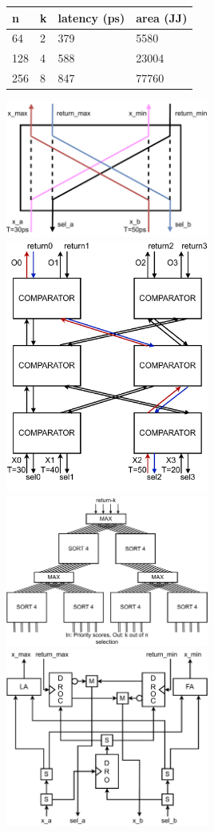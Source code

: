 \documentclass{article}
\begin{document}

\begin{table}[]
\begin{tabular}{|l|l|l|l|}
\hline
n   & k & latency (ps) & area (JJ) \\ \hline
64  & 2 & 379          & 5580      \\ \hline
128 & 4 & 588          & 23004     \\ \hline
256 & 8 & 847          & 77760     \\ \hline
\end{tabular}
\end{table}

\includegraphics*[width=0.5\textwidth]{diagrams/comparator.drawio.pdf}
\includegraphics*[width=0.5\textwidth]{diagrams/sort4.drawio.pdf}
\includegraphics*[width=0.5\textwidth]{diagrams/arbiterk4n16.drawio.pdf}
\includegraphics*[width=0.5\textwidth]{diagrams/circuit_comparator.drawio.pdf}
\end{document}
